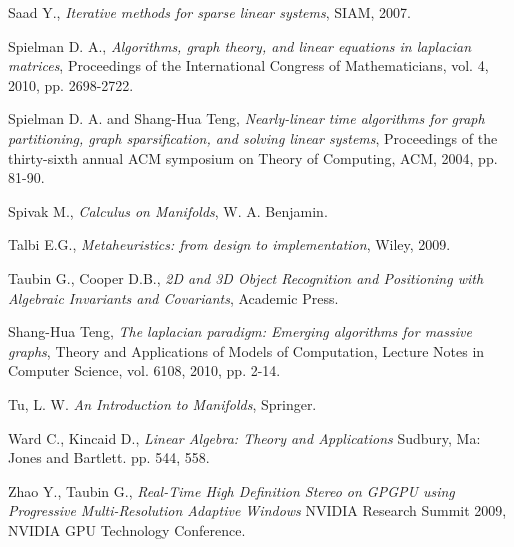 \documentclass[conference,compsoc,a4paper]{IEEEtran}
\begin{document}
\begin{thebibliography}{1}
Saad Y., 
\newblock \textit{Iterative methods for sparse linear systems}, 
\newblock SIAM, 2007.

Spielman D. A.,
\newblock \textit{Algorithms, graph theory, and linear equations in laplacian 
matrices}, 
\newblock Proceedings of the International Congress of Mathematicians, vol. 4, 
2010, pp. 2698-2722.

Spielman D. A. and Shang-Hua Teng,
\newblock \textit{Nearly-linear time algorithms for graph partitioning, graph 
sparsification, and solving linear systems}, 
\newblock Proceedings of the thirty-sixth annual ACM symposium on Theory of 
Computing, ACM, 2004, pp. 81-90.

Spivak M.,
\newblock \textit{Calculus on Manifolds},
\newblock W. A. Benjamin.

Talbi E.G., 
\newblock \textit{Metaheuristics: from design to implementation}, 
\newblock Wiley, 2009.

Taubin G., Cooper D.B., 
\newblock \textit{2D and 3D Object Recognition and Positioning with 
Algebraic Invariants and Covariants}, 
\newblock Academic Press.

Shang-Hua Teng,
\newblock \textit{The laplacian paradigm: Emerging algorithms for massive 
graphs}, 
\newblock Theory and Applications of Models of Computation, Lecture Notes in 
Computer Science, vol. 6108, 2010, pp. 2-14.

Tu, L. W. 
\newblock \textit{An Introduction to Manifolds},
\newblock Springer.

Ward C., Kincaid D., 
\newblock \textit{Linear Algebra: Theory and Applications}
\newblock Sudbury, Ma: Jones and Bartlett. pp. 544, 558.

Zhao Y., Taubin G., 
\newblock \textit{Real-Time High Definition Stereo on GPGPU using 
Progressive Multi-Resolution Adaptive Windows}
\newblock NVIDIA Research Summit 2009, NVIDIA GPU Technology Conference.

\end{thebibliography}

\end{document}
